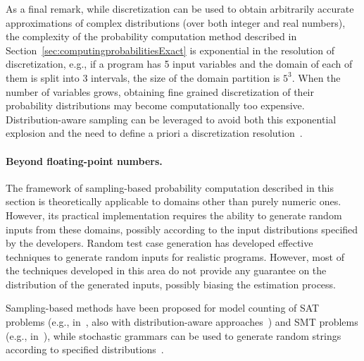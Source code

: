 As a final remark, while discretization can be used to obtain arbitrarily accurate approximations of complex distributions (over both integer and real numbers), the complexity of the probability computation method described in Section~\ref{sec:computingprobabilitiesExact} is exponential in the resolution of discretization, e.g., if a program has 5 input variables and the domain of each of them is split into 3 intervals, the size of the domain partition is $5^3$. When the number of variables grows, obtaining fine grained discretization of their probability distributions may become computationally too expensive. Distribution-aware sampling can be leveraged to avoid both this exponential explosion and the need to define a priori a discretization resolution~\cite{2015-fse-qcoral}.


\paragraph{Beyond floating-point numbers.}
The framework of sampling-based probability computation described in this section is theoretically applicable to domains other than purely numeric ones. However, its practical implementation requires the ability to generate random inputs from these domains, possibly according to the input distributions specified by the developers. Random test case generation has developed effective techniques to generate random inputs for realistic programs. However, most of the techniques developed in this area do not provide any guarantee on the distribution of the generated inputs, possibly biasing the estimation process. 

Sampling-based methods have been proposed for model counting of SAT problems (e.g., in~\cite{satCounting01,biere2009handbook,journalscorrMeel14}, also with distribution-aware approaches~\cite{chakraborty2014distribution}) and SMT problems (e.g., in~\cite{countingSMT}), while stochastic grammars can be used to generate random strings according to specified distributions~\cite{stochasticGrammars}.




